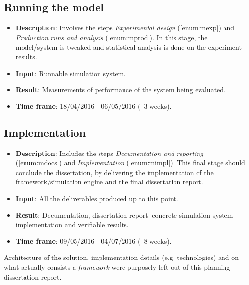 \subsection{Running the model}

\begin{itemize}
    \item \textbf{Description}: Involves the steps \textit{Experimental design} 
    (\ref{enum:mexp}) and \textit{Production runs and analysis} 
    (\ref{enum:mprod}). In this stage, the model/system is tweaked and 
    statistical analysis is done on the experiment results.
    \item \textbf{Input}: Runnable simulation system.
    \item \textbf{Result}: Measurements of performance of the system being 
    evaluated.
    \item \textbf{Time frame}: 18/04/2016 - 06/05/2016 (~3 weeks).
\end{itemize}

\subsection{Implementation}

\begin{itemize}
    \item \textbf{Description}: Includes the steps \textit{Documentation and 
    reporting} (\ref{enum:mdocs}) and \textit{Implementation} 
    (\ref{enum:mimpl}). This final stage should conclude the dissertation, by 
    delivering the implementation of the framework/simulation engine and the 
    final dissertation report.
    \item \textbf{Input}: All the deliverables produced up to this point.
    \item \textbf{Result}: Documentation, dissertation report, concrete 
    simulation system implementation and verifiable results.
    \item \textbf{Time frame}: 09/05/2016 - 04/07/2016 (~8 weeks).
\end{itemize}

Architecture of the solution, implementation details (e.g. technologies) and on 
what actually consists a \textit{framework} were purposely left out of this 
planning dissertation report.
